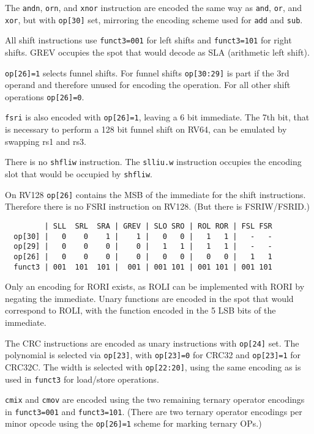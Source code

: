 The {\tt andn}, {\tt orn}, and {\tt xnor} instruction are encoded the same way
as {\tt and}, {\tt or}, and {\tt xor}, but with {\tt op[30]} set, mirroring the
encoding scheme used for {\tt add} and {\tt sub}.

All shift instructions use {\tt funct3=001} for left shifts and {\tt funct3=101}
for right shifts. GREV occupies the spot that would decode as SLA (arithmetic
left shift).

{\tt op[26]=1} selects funnel shifts. For funnel shifts {\tt op[30:29]} is part
if the 3rd operand and therefore unused for encoding the operation. For all other
shift operations {\tt op[26]=0}.

{\tt fsri} is also encoded with {\tt op[26]=1}, leaving a 6 bit immediate. The 7th
bit, that is necessary to perform a 128 bit funnel shift on RV64, can be
emulated by swapping rs1 and rs3.

There is no {\tt shfliw} instruction. The {\tt slliu.w} instruction occupies
the encoding slot that would be occupied by {\tt shfliw}.

On RV128 {\tt op[26]} contains the MSB of the immediate for the shift instructions.
Therefore there is no FSRI instruction on RV128. (But there is FSRIW/FSRID.)

\begin{minipage}{\linewidth}
\begin{verbatim}
         | SLL  SRL  SRA | GREV | SLO SRO | ROL ROR | FSL FSR
  op[30] |   0    0    1 |    1 |   0   0 |   1   1 |   -   -
  op[29] |   0    0    0 |    0 |   1   1 |   1   1 |   -   -
  op[26] |   0    0    0 |    0 |   0   0 |   0   0 |   1   1
  funct3 | 001  101  101 |  001 | 001 101 | 001 101 | 001 101
\end{verbatim}
\end{minipage}

Only an encoding for RORI exists, as ROLI can be implemented with RORI by negating
the immediate. Unary functions are encoded in the spot that would correspond to ROLI,
with the function encoded in the 5 LSB bits of the immediate.

The CRC instructions are encoded as unary instructions with {\tt op[24]} set. The
polynomial is selected via {\tt op[23]}, with {\tt op[23]=0} for CRC32 and
{\tt op[23]=1} for CRC32C. The width is selected with {\tt op[22:20]}, using
the same encoding as is used in {\tt funct3} for load/store operations.

{\tt cmix} and {\tt cmov} are encoded using the two remaining ternary operator
encodings in {\tt funct3=001} and {\tt funct3=101}. (There are two ternary
operator encodings per minor opcode using the {\tt op[26]=1} scheme for
marking ternary OPs.)

